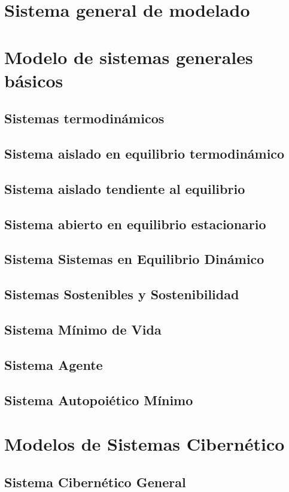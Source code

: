 \section{Sistema general de modelado}
\section{Modelo de sistemas generales básicos}
\subsection{Sistemas termodinámicos}
\subsection{Sistema aislado en equilibrio termodinámico}
\subsection{Sistema aislado tendiente al equilibrio}
\subsection{Sistema abierto en equilibrio estacionario}
\subsection{Sistema Sistemas en Equilibrio Dinámico}
\subsection{Sistemas Sostenibles y Sostenibilidad}
\subsection{Sistema Mínimo de Vida}
\subsection{Sistema Agente}
\subsection{Sistema Autopoiético Mínimo}
\section{Modelos de Sistemas Cibernético}

\subsection{Sistema Cibernético General}
